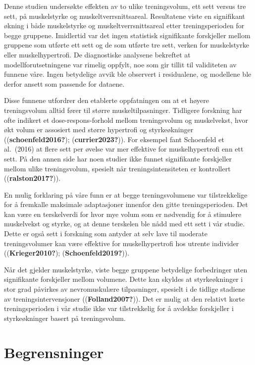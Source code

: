 \documentclass[
  letterpaper,
  DIV=11,
  numbers=noendperiod]{scrreprt}
\begin{document}
Denne studien undersøkte effekten av to ulike treningsvolum, ett sett
versus tre sett, på muskelstyrke og muskeltverrsnittsareal. Resultatene
viste en signifikant økning i både muskelstyrke og
muskeltverrsnittsareal etter treningsperioden for begge gruppene.
Imidlertid var det ingen statistisk signifikante forskjeller mellom
gruppene som utførte ett sett og de som utførte tre sett, verken for
muskelstyrke eller muskelhypertrofi. De diagnostiske analysene bekreftet
at modellforutsetningene var rimelig oppfylt, noe som gir tillit til
validiteten av funnene våre. Ingen betydelige avvik ble observert i
residualene, og modellene ble derfor ansett som passende for dataene.

Disse funnene utfordrer den etablerte oppfatningen om at et høyere
treningsvolum alltid fører til større muskeltilpasninger. Tidligere
forskning har ofte indikert et dose-respons-forhold mellom treningsvolum
og muskelvekst, hvor økt volum er assosiert med større hypertrofi og
styrkeøkninger ((\textbf{schoenfeld2016?}); (\textbf{currier2023?})).
For eksempel fant Schoenfeld et al.~(2016) at flere sett per øvelse var
mer effektive for muskelhypertrofi enn ett sett. På den annen side har
noen studier ikke funnet signifikante forskjeller mellom ulike
treningsvolum, spesielt når treningsintensiteten er kontrollert
((\textbf{ralston2017?})).

En mulig forklaring på våre funn er at begge treningsvolumene var
tilstrekkelige for å fremkalle maksimale adaptasjoner innenfor den gitte
treningsperioden. Det kan være en terskelverdi for hvor mye volum som er
nødvendig for å stimulere muskelvekst og styrke, og at denne terskelen
ble nådd med ett sett i vår studie. Dette er også sett i forskning som
antyder at selv lave til moderate treningsvolumer kan være effektive for
muskelhypertrofi hos utrente individer ((\textbf{Krieger2010?});
(\textbf{Schoenfeld2019?})).

Når det gjelder muskelstyrke, viste begge gruppene betydelige
forbedringer uten signifikante forskjeller mellom volumene. Dette kan
skyldes at styrkeøkninger i stor grad påvirkes av nevromuskulære
tilpasninger, spesielt i de tidlige stadiene av treningsintervensjoner
((\textbf{Folland2007?})). Det er mulig at den relativt korte
treningsperioden i vår studie ikke var tilstrekkelig for å avdekke
forskjeller i styrkeøkninger basert på treningsvolum.

\section{Begrensninger}\label{begrensninger}
\end{document}

